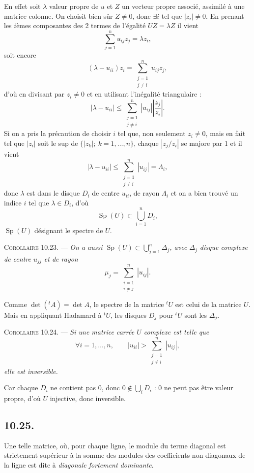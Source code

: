 En effet soit $\lambda$ valeur propre de $u$ et $Z$ un vecteur propre associé, assimilé à une matrice colonne. On choisit bien sûr $Z\ne0$, donc $\exists i$ tel que $|z_i|\ne0$. En prenant les $i$èmes composantes des 2 termes de l'égalité $UZ=\lambda Z$ il vient
\[
\sum_{j=1}^nu_{ij}z_j=\lambda z_i,
\]
soit encore
\[
(\lambda-u_{ii})z_i=\sum_{\substack{j=1\\j\ne i}}^nu_{ij}z_j,
\]
d'où en divisant par $z_i\ne0$ et en utilisant l'inégalité triangulaire :
\[
|\lambda-u_{ii}|\le\sum_{\substack{j=1\\j\ne i}}^n|u_{ij}|\left|\frac{z_j}{z_i}\right|.
\]
Si on a pris la précaution de choisir $i$ tel que, non seulement $z_i\ne0$, mais en fait tel que $|z_i|$ soit le sup de $\{|z_k|;\ k=1,\ldots,n\}$, chaque $|z_j/z_i|$ se majore par 1 et il vient
\[
|\lambda-u_{ii}|\le\sum_{\substack{j=1\\j\ne i}}^n|u_{ij}|=\Lambda_i,
\]
donc $\lambda$ est dans le disque $D_i$ de centre $u_{ii}$, de rayon $\Lambda_i$ et on a bien trouvé un indice $i$ tel que $\lambda\in D_i$, d'où
\[
\operatorname{Sp}(U)\subset\bigcup_{i=1}^nD_i,
\]
$\operatorname{Sp}(U)$ désignant le spectre de $U$. \bookend

\medskip\noindent\textsc{Corollaire 10.23.} --- \emph{On a aussi $\operatorname{Sp}(U)\subset\bigcup_{j=1}^n\Delta_j$, avec $\Delta_j$ disque complexe de centre $u_{jj}$ et de rayon}
\[
\mu_j=\sum_{\substack{i=1\\i\ne j}}^n|u_{ij}|.
\]

Comme $\det({}^tA)=\det A$, le spectre de la matrice ${}^tU$ est celui de la matrice $U$. Mais en appliquant Hadamard à ${}^tU$, les disques $D_j$ pour ${}^tU$ sont les $\Delta_j$. \bookend

\medskip\noindent\textsc{Corollaire 10.24.} --- \emph{Si une matrice carrée $U$ complexe est telle que}
\[
\forall i=1,\ldots,n,\qquad |u_{ii}|>\sum_{\substack{j=1\\j\ne i}}^n|u_{ij}|,
\]
\emph{elle est inversible.}

Car chaque $D_i$ ne contient pas 0, donc $0\notin\bigcup_iD_i$ : 0 ne peut pas être valeur propre, d'où $U$ injective, donc inversible. \bookend

\subsection*{10.25.}
Une telle matrice, où, pour chaque ligne, le module du terme diagonal est strictement supérieur à la somme des modules des coefficients non diagonaux de la ligne est dite à \emph{diagonale fortement dominante}.

